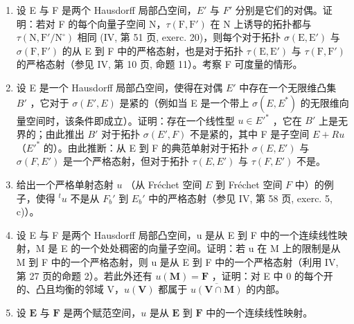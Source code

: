 \exercisegroup

\begin{enumerate}
\def\labelenumi{\arabic{enumi})}
\item
  设 E 与 F 是两个 Hausdorff 局部凸空间，\(E'\) 与 \(F'\) 分别是它们的对偶。证明：若对 F 的每个向量子空间 N，\(\tau(\mathrm{F}, \mathrm{F}')\) 在 N 上诱导的拓扑都与 \(\tau(\mathrm{N}, \mathrm{F}'/\mathrm{N}^{\circ})\) 相同 (IV, 第 51 页, exerc. 20)，则每个对于拓扑 \(\sigma(\mathrm{E}, \mathrm{E}')\) 与 \(\sigma(\mathrm{F}, \mathrm{F}')\) 的从 E 到 F 中的严格态射，也是对于拓扑 \(\tau(\mathrm{E}, \mathrm{E}')\) 与 \(\tau(\mathrm{F}, \mathrm{F}')\) 的严格态射（参见 IV, 第 10 页, 命题 11）。考察 F 可度量的情形。
\item
  设 E 是一个 Hausdorff 局部凸空间，使得在对偶 \(E'\) 中存在一个无限维凸集 \(B'\) ，它对于 \(\sigma(E', E)\) 是紧的（例如当 E 是一个带上 \(\sigma(E, E^{*})\) 的无限维向量空间时，该条件即成立）。证明：存在一个线性型 \(u \in E'^{*}\) ，它在 \(B'\) 上是无界的；由此推出 \(B'\) 对于拓扑 \(\sigma(E', F)\) 不是紧的，其中 F 是子空间 \(E + Ru\) （\(E'^{*}\) 的）。由此推断：从 E 到 F 的典范单射对于拓扑 \(\sigma(E, E')\) 与 \(\sigma(F, E')\) 是一个严格态射，但对于拓扑 \(\tau(E, E')\) 与 \(\tau(F, E')\) 不是。
\item
  给出一个严格单射态射 \(u\) （从 Fréchet 空间 \(E\) 到 Fréchet 空间 \(F\) 中）的例子，使得 \(^t u\) 不是从 \(F_b'\) 到 \(E_b'\) 中的严格态射（参见 IV, 第 58 页, exerc. 5, c)）。
\item
  设 E 与 F 是两个 Hausdorff 局部凸空间，u 是从 E 到 F 中的一个连续线性映射，M 是 E 的一个处处稠密的向量子空间。证明：若 u 在 M 上的限制是从 M 到 F 中的一个严格态射，则 u 是从 E 到 F 中的一个严格态射（利用 IV, 第 27 页的命题 2）。若此外还有 \(u(\mathbf{M}) = \mathbf{F}\) ，证明：对 E 中 0 的每个开的、凸且均衡的邻域 V，\(u(\mathbf{V})\) 都属于 \(\overline{u(\mathbf{V} \cap \mathbf{M})}\) 的内部。
\item
  设 \(\mathbf{E}\) 与 \(\mathbf{F}\) 是两个赋范空间，\(u\) 是从 \(\mathbf{E}\) 到 \(\mathbf{F}\) 中的一个连续线性映射。
\end{enumerate}

